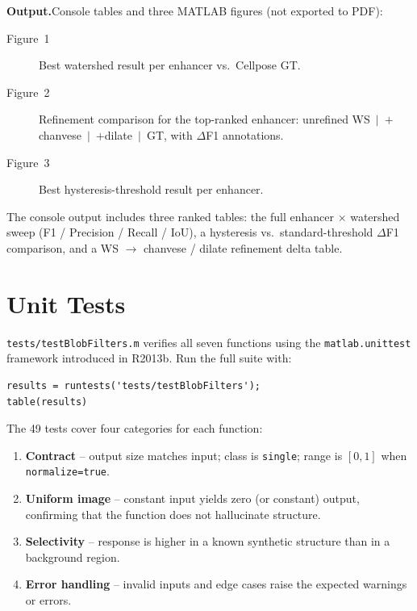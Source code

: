 \documentclass[a4paper, justified]{tufte-book}
\begin{document}
\noindent\textbf{Output.}\quad Console tables and three MATLAB figures
(not exported to PDF):
\begin{description}
  \item[Figure~1] Best watershed result per enhancer vs.\ Cellpose GT\@.
  \item[Figure~2] Refinement comparison for the top-ranked enhancer:
    unrefined WS~$|$~$+$chanvese~$|$~$+$dilate~$|$~GT, with $\Delta$F1
    annotations.
  \item[Figure~3] Best hysteresis-threshold result per enhancer.
\end{description}

The console output includes three ranked tables: the full enhancer $\times$
watershed sweep (F1 / Precision / Recall / IoU), a hysteresis vs.\
standard-threshold $\Delta$F1 comparison, and a WS $\to$ chanvese / dilate
refinement delta table.

\chapter{Unit Tests}
\label{ch:tests}

 \texttt{tests/testBlobFilters.m}
verifies all seven functions using the \texttt{matlab.unittest} framework
introduced in R2013b.  Run the full suite with:

\begin{lstlisting}
results = runtests('tests/testBlobFilters');
table(results)
\end{lstlisting}

The 49 tests cover four categories for each function:

\begin{enumerate}
  \item \textbf{Contract} -- output size matches input; class is
    \texttt{single}; range is $[0,1]$ when \texttt{normalize=true}.
  \item \textbf{Uniform image} -- constant input yields zero (or constant)
    output, confirming that the function does not hallucinate structure.
  \item \textbf{Selectivity} -- response is higher in a known synthetic
    structure than in a background region.
  \item \textbf{Error handling} -- invalid inputs and edge cases raise the
    expected warnings or errors.
\end{enumerate}
\end{document}
